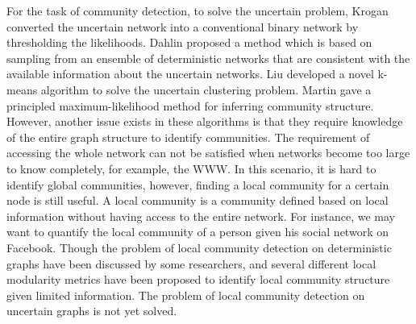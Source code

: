 \documentclass[\main/thesis.tex]{subfiles}
\begin{document}
For the task of community detection, to solve the uncertain problem, Krogan \cite{krogan2006global} converted the uncertain network into a conventional binary network by thresholding the likelihoods. Dahlin \cite{dahlin2011method} proposed a method which is based on sampling from an ensemble of deterministic networks that are consistent with the available information about the uncertain networks. Liu \cite{liureliable} developed a novel k-means algorithm to solve the uncertain clustering problem. Martin \cite{martin2016structural} gave a principled maximum-likelihood method for inferring community structure. However, another issue exists in these algorithms is that they require knowledge of the entire graph structure to identify communities. The requirement of accessing the whole network can not be satisfied when networks become too large to know completely, for example, the WWW. In this scenario, it is hard to identify global communities, however, finding a local community for a certain node is still useful. A local community is a community defined based on local information without having access to the entire network. For instance, we may want to quantify the local community of a person given his social network on Facebook. Though the problem of local community detection on deterministic graphs have been discussed by some researchers, and several different local modularity metrics \cite{clauset2005finding,chen2009detecting,chen2009local} have been proposed to identify local community structure given limited information. The problem of local community detection on uncertain graphs is not yet solved.
\end{document}
